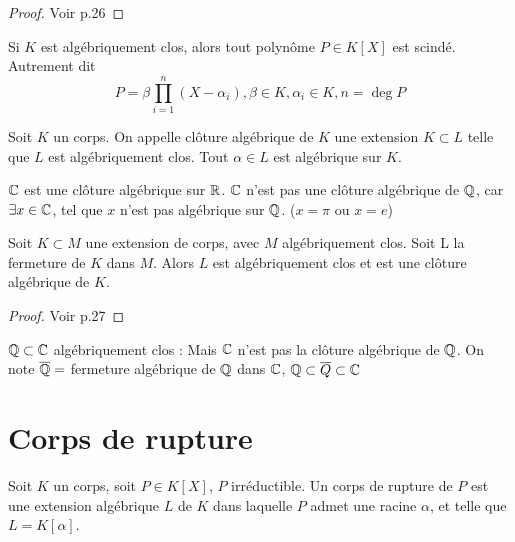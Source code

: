 \documentclass[]{report}
\begin{document}
    \begin{proof}
        Voir p.26
    \end{proof}

    \begin{cor}{}{}
        Si $K$ est algébriquement clos, alors tout polynôme $P\in K[X]$ est scindé. Autrement dit $$P=\beta\prod_{i=1}^n(X-\alpha_i),\beta\in K,\alpha_i\in K,n=\deg P$$
    \end{cor}

    \begin{df}{}{}
        Soit $K$ un corps. On appelle clôture algébrique de $K$ une extension $K\subset L$ telle que $L$ est algébriquement clos. Tout $\alpha\in L$ est algébrique sur $K$.
    \end{df}

    \begin{ex}{}{}
        $\mathbb{C}$ est une clôture algébrique sur $\mathbb{R}$. $\mathbb{C}$ n'est pas une clôture algébrique de $\mathbb{Q}$, car $\exists x \in \mathbb{C}$, tel que $x$ n'est pas algébrique sur $\mathbb{Q}$. ($x=\pi$ ou $x=e$)
    \end{ex}

    \begin{prop}{}{}
        Soit $K\subset M$ une extension de corps, avec $M$ algébriquement clos. Soit L la fermeture de $K$ dans $M$. Alors $L$ est algébriquement clos et est une clôture algébrique de $K$.
    \end{prop}

    \begin{proof}
        Voir p.27
    \end{proof}

    \begin{ex}{}{}
        $\mathbb{Q}\subset\mathbb{C}$ algébriquement clos : Mais $\mathbb{C}$ n'est pas la clôture algébrique de $\mathbb{Q}$. On note $\overline{\mathbb{Q}}=$ fermeture algébrique de $\mathbb{Q}$ dans $\mathbb{C}$, $\mathbb{Q}\subset\overline{Q}\subset\mathbb{C}$
    \end{ex}

    \section{Corps de rupture}

    \begin{df}{}{}
        Soit $K$ un corps, soit $P\in K[X]$, $P$ irréductible. Un corps de rupture de $P$ est une extension algébrique $L$ de $K$ dans laquelle $P$ admet une racine $\alpha$, et telle que $L=K[\alpha]$.
    \end{df}
\end{document}
